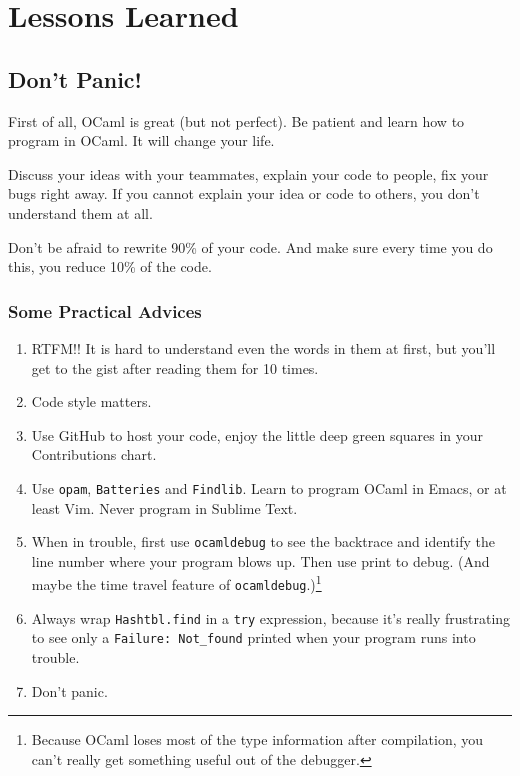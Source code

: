 \documentclass{report}
\begin{document}
\chapter{Lessons Learned}

\section{Don't Panic!}

First of all, OCaml is great (but not perfect). Be patient and learn how to program in OCaml. It will change your life.

Discuss your ideas with your teammates, explain your code to people, fix your bugs right away. If you cannot explain your idea or code to others, you don't understand them at all.

Don't be afraid to rewrite 90\% of your code. And make sure every time you do this, you reduce 10\% of the code.

\subsection{Some Practical Advices}
\begin{enumerate}
\item RTFM!! It is hard to understand even the words in them at first, but you'll get to the gist after reading them for 10 times.

\item Code style matters.

\item Use GitHub to host your code, enjoy the little deep green squares in your Contributions chart.

\item Use \texttt{opam}, \texttt{Batteries} and \texttt{Findlib}. Learn to program OCaml in Emacs, or at least Vim. Never program in Sublime Text.

\item When in trouble, first use \texttt{ocamldebug} to see the backtrace and identify the line number where your program blows up. Then use print to debug. (And maybe the time travel feature of \texttt{ocamldebug}.)\footnote{Because OCaml loses most of the type information after compilation, you can't really get something useful out of the debugger.}

\item Always wrap \texttt{Hashtbl.find} in a \texttt{try} expression, because it's really frustrating to see only a \texttt{Failure: Not\_found} printed when your program runs into trouble.

\item Don't panic.
\end{enumerate}
\end{document}
